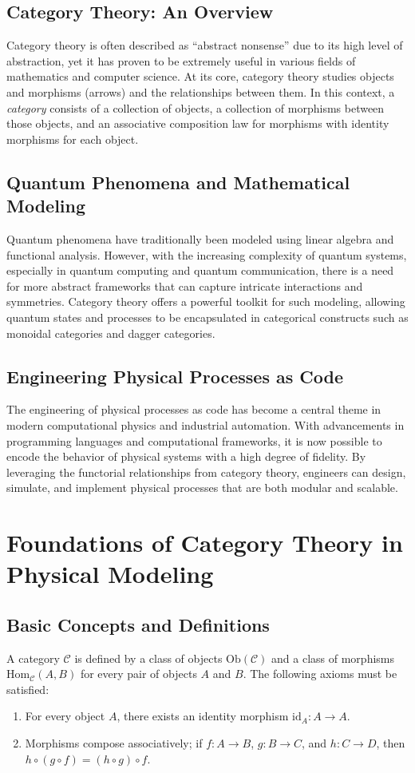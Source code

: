 \documentclass[11pt]{article}
\begin{document}
\subsection{Category Theory: An Overview}
Category theory is often described as “abstract nonsense” due to its high level of abstraction, yet it has proven to be extremely useful in various fields of mathematics and computer science. At its core, category theory studies objects and morphisms (arrows) and the relationships between them. In this context, a \emph{category} consists of a collection of objects, a collection of morphisms between those objects, and an associative composition law for morphisms with identity morphisms for each object.

\subsection{Quantum Phenomena and Mathematical Modeling}
Quantum phenomena have traditionally been modeled using linear algebra and functional analysis. However, with the increasing complexity of quantum systems, especially in quantum computing and quantum communication, there is a need for more abstract frameworks that can capture intricate interactions and symmetries. Category theory offers a powerful toolkit for such modeling, allowing quantum states and processes to be encapsulated in categorical constructs such as monoidal categories and dagger categories.

\subsection{Engineering Physical Processes as Code}
The engineering of physical processes as code has become a central theme in modern computational physics and industrial automation. With advancements in programming languages and computational frameworks, it is now possible to encode the behavior of physical systems with a high degree of fidelity. By leveraging the functorial relationships from category theory, engineers can design, simulate, and implement physical processes that are both modular and scalable.

\section{Foundations of Category Theory in Physical Modeling}
\subsection{Basic Concepts and Definitions}
A category $\mathcal{C}$ is defined by a class of objects $\text{Ob}(\mathcal{C})$ and a class of morphisms $\text{Hom}_{\mathcal{C}}(A,B)$ for every pair of objects $A$ and $B$. The following axioms must be satisfied:
\begin{enumerate}[label=(\roman*)]
    \item For every object $A$, there exists an identity morphism $\mathrm{id}_A: A \to A$.
    \item Morphisms compose associatively; if $f: A \to B$, $g: B \to C$, and $h: C \to D$, then $h \circ (g \circ f) = (h \circ g) \circ f$.
\end{enumerate}
\end{document}
